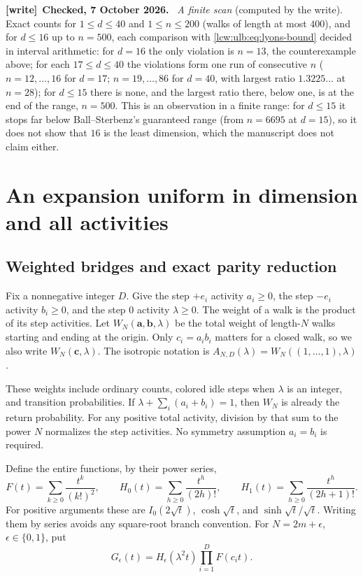\documentclass[11pt,letterpaper]{article}
\theoremstyle{remark}\newtheorem{remark}[theorem]{Remark}
\newenvironment{writenote}[1][]{\par\smallskip\begingroup\small
 \noindent\textbf{[write]}\if\relax\detokenize{#1}\relax\else~\textbf{#1.}\fi\ }%
 {\par\endgroup\smallskip}
\newcommand{\ep}{\epsilon}
\begin{document}
\begin{writenote}[Checked, 7 October 2026]
\emph{A finite scan} (computed by the write). Exact counts for $1\le d\le40$
and $1\le n\le200$ (walks of length at most $400$), and for $d\le16$ up to
$n=500$, each comparison with \eqref{lcw:ulb:eq:lyons-bound} decided in
interval arithmetic: for $d=16$ the only violation is $n=13$, the
counterexample above; for each $17\le d\le40$ the violations form one run of
consecutive $n$ ($n=12,\dots,16$ for $d=17$; $n=19,\dots,86$ for $d=40$, with
largest ratio $1.3225\ldots$ at $n=28$); for $d\le15$ there is none, and the
largest ratio there, below one, is at the end of the range, $n=500$. This is an observation in a finite
range: for $d\le15$ it stops far below Ball--Sterbenz's guaranteed range
(from $n=6695$ at $d=15$), so it does not show that $16$ is the least
dimension, which the manuscript does not claim either.
\end{writenote}

\section{An expansion uniform in dimension and all activities}
\label{lcw:ulb:sec:global}

\subsection{Weighted bridges and exact parity reduction}

Fix a nonnegative integer $D$. Give the step $+e_i$ activity $a_i\ge0$,
the step $-e_i$ activity $b_i\ge0$, and the step $0$ activity
$\lambda\ge0$. The weight of a walk is the product of its step
activities. Let $W_N(\boldsymbol a,\boldsymbol b,\lambda)$ be the
total weight of length-$N$ walks starting and ending at the origin.
Only $c_i=a_i b_i$ matters for a closed walk, so we also write
$W_N(\boldsymbol c,\lambda)$. The isotropic notation is
$A_{N,D}(\lambda)=W_N((1,\ldots,1),\lambda)$.

These weights include ordinary counts, colored idle steps when $\lambda$
is an integer, and transition probabilities. If
$\lambda+\sum_i(a_i+b_i)=1$, then $W_N$ is already the return
probability. For any positive total activity, division by that sum to the power $N$ normalizes
the step activities. No symmetry assumption $a_i=b_i$ is required.

Define the entire functions, by their power series,
\begin{equation}\label{lcw:ulb:eq:entire}
 F(t)=\sum_{k\ge0}\frac{t^k}{(k!)^2},\qquad
 H_0(t)=\sum_{h\ge0}\frac{t^h}{(2h)!},\qquad
 H_1(t)=\sum_{h\ge0}\frac{t^h}{(2h+1)!}.
\end{equation}
For positive arguments these are
$I_0(2\sqrt t)$, $\cosh\sqrt t$, and $\sinh\sqrt t/\sqrt t$.
Writing them by series avoids any square-root branch convention.
For $N=2m+\ep$, $\ep\in\{0,1\}$, put
\begin{equation}\label{lcw:ulb:eq:Ge}
 G_\ep(t)=H_\ep(\lambda^2t)\prod_{i=1}^D F(c_i t).
\end{equation}
\end{document}
